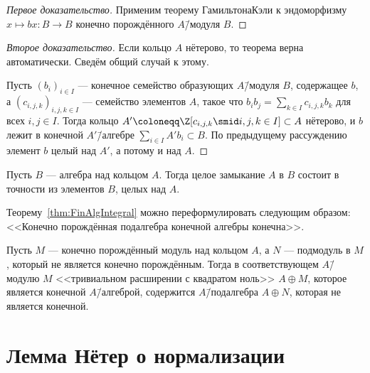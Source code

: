 \documentclass[
	extrafontsizes,
	11pt,
	hyphens,
]{memoir}
\begin{document}
\begin{proof}[Первое доказательство]
Применим теорему Гамильтона\namedash{}Кэли к эндоморфизму \(x \mapsto bx : B \to B\) конечно порождённого \(A\)\=/модуля \(B\).
\end{proof}

\begin{proof}[Второе доказательство]
Если кольцо \(A\) нётерово,
то теорема верна автоматически.
Сведём общий случай к этому.

Пусть \((b_i)_{i \in I}\) --- конечное семейство образующих \(A\)\=/модуля \(B\), содержащее \(b\),
а \((c_{i,j,k})_{i,j,k \in I}\) --- семейство элементов \(A\), такое что \(b_i b_j = \sum_{k \in I} c_{i,j,k} b_k\) для всех \(i,j \in I\).
Тогда кольцо \(A' \coloneqq \Z[c_{i,j,k} \smid i,j,k \in I] \subset A\) нётерово, и \(b\) лежит в конечной \(A'\)\=/алгебре \(\sum_{i \in I} A'b_i \subset B\). По предыдущему рассуждению элемент \(b\) целый над \(A'\), а потому и над \(A\).
\end{proof}

\begin{corollary}
Пусть \(B\) --- алгебра над кольцом \(A\).
Тогда целое замыкание \(A\) в \(B\) состоит в точности из элементов \(B\), целых над \(A\).
\end{corollary}

\begin{remark}
Теорему~\ref{thm:FinAlgIntegral} можно переформулировать следующим образом:
<<Конечно порождённая подалгебра конечной алгебры конечна>>.
\end{remark}

\begin{example}
Пусть \(M\) --- конечно порождённый модуль над кольцом \(A\), а \(N\) --- подмодуль в \(M\), который не является конечно порождённым.
Тогда в соответствующем \(A\)\=/модулю \(M\) <<тривиальном расширении с квадратом ноль>> \(A \oplus M\), которое является конечной \(A\)\=/алгеброй, содержится \(A\)\=/подалгебра \(A \oplus N\), которая не является конечной.
\end{example}


\section{Лемма Нётер о нормализации}

\end{document}
